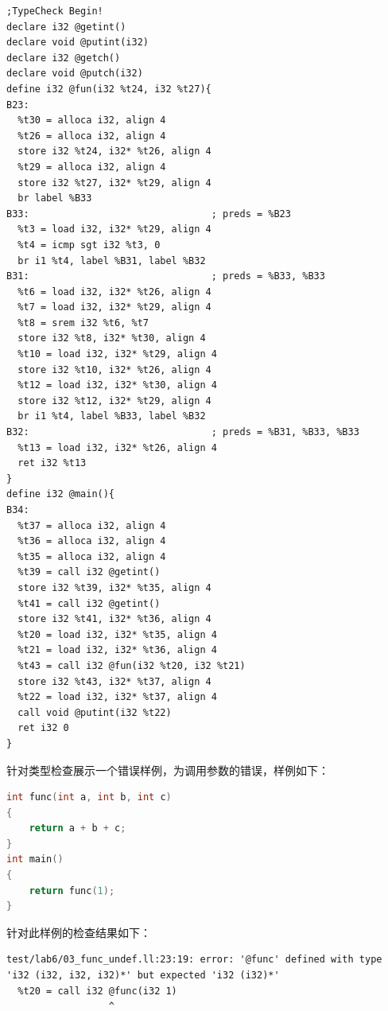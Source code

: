 \documentclass[UTF8,a4paper,10pt]{ctexart}
\begin{document}
\begin{lstlisting}[title = 中间代码结果]
;TypeCheck Begin!
declare i32 @getint()
declare void @putint(i32)
declare i32 @getch()
declare void @putch(i32)
define i32 @fun(i32 %t24, i32 %t27){
B23:
  %t30 = alloca i32, align 4
  %t26 = alloca i32, align 4
  store i32 %t24, i32* %t26, align 4
  %t29 = alloca i32, align 4
  store i32 %t27, i32* %t29, align 4
  br label %B33
B33:                               	; preds = %B23
  %t3 = load i32, i32* %t29, align 4
  %t4 = icmp sgt i32 %t3, 0
  br i1 %t4, label %B31, label %B32
B31:                               	; preds = %B33, %B33
  %t6 = load i32, i32* %t26, align 4
  %t7 = load i32, i32* %t29, align 4
  %t8 = srem i32 %t6, %t7
  store i32 %t8, i32* %t30, align 4
  %t10 = load i32, i32* %t29, align 4
  store i32 %t10, i32* %t26, align 4
  %t12 = load i32, i32* %t30, align 4
  store i32 %t12, i32* %t29, align 4
  br i1 %t4, label %B33, label %B32
B32:                               	; preds = %B31, %B33, %B33
  %t13 = load i32, i32* %t26, align 4
  ret i32 %t13
}
define i32 @main(){
B34:
  %t37 = alloca i32, align 4
  %t36 = alloca i32, align 4
  %t35 = alloca i32, align 4
  %t39 = call i32 @getint()
  store i32 %t39, i32* %t35, align 4
  %t41 = call i32 @getint()
  store i32 %t41, i32* %t36, align 4
  %t20 = load i32, i32* %t35, align 4
  %t21 = load i32, i32* %t36, align 4
  %t43 = call i32 @fun(i32 %t20, i32 %t21)
  store i32 %t43, i32* %t37, align 4
  %t22 = load i32, i32* %t37, align 4
  call void @putint(i32 %t22)
  ret i32 0
}
\end{lstlisting}



针对类型检查展示一个错误样例，为调用参数的错误，样例如下：

\begin{lstlisting}[title = 类型检查样例代码, language = c++]
int func(int a, int b, int c)
{
	return a + b + c;
}
int main()
{
	return func(1);
}
\end{lstlisting}

针对此样例的检查结果如下：

\begin{lstlisting}[title = 类型检查结果]
test/lab6/03_func_undef.ll:23:19: error: '@func' defined with type 'i32 (i32, i32, i32)*' but expected 'i32 (i32)*'
  %t20 = call i32 @func(i32 1)
                  ^
\end{lstlisting}




\end{document}
